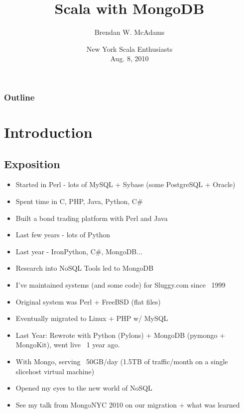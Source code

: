 \documentclass{beamer}
\title[Integrating Scala + MongoDB]{Scala with MongoDB} %
\author[B.W. McAdams]{Brendan W. McAdams}
\institute[Novus Partners]{Novus Partners, Inc.}
\date[NY Scala Enthusiasts - 8/8/10]
     {New York Scala Enthusiasts\\ Aug. 8, 2010}
\newenvironment{itemizeframe}
               {\begin{frame}\startitemizeframe} 
               {\stopitemizeframe\end{frame}}
\newcommand\startitemizeframe{\begin{itemize}} \newcommand\stopitemizeframe{\end{itemize}}
\begin{document}
\begin{frame}
  \titlepage
\end{frame}

\begin{frame}
\frametitle{Outline}
  \tableofcontents
\end{frame}

\section{Introduction}
\subsection{Exposition}

\begin{itemizeframe}
\frametitle{Who Am I?}
    \item Started in Perl - lots of MySQL + Sybase (some PostgreSQL + Oracle)
	\item Spent time in C, PHP, Java, Python, C\#
	\item Built a bond trading platform with Perl and Java
	\item Last few years - lots of Python
	\item Last year - IronPython, C\#, MongoDB... 
	\item Research into NoSQL Tools led to MongoDB
\end{itemizeframe}


\begin{itemizeframe}
\frametitle{Briefly - Sluggy.com Rundown}
    \item I've maintained systems (and some code) for Sluggy.com since ~1999
    \item Original system was Perl + FreeBSD (flat files)
    \item Eventually migrated to Linux + PHP w/ MySQL
    \item Last Year: Rewrote with Python (Pylons) + MongoDB (pymongo + MongoKit), went live ~1 year ago.
    \item With Mongo, serving ~50GB/day (1.5TB of traffic/month on a single slicehost virtual machine)
    \item Opened my eyes to the new world of NoSQL
    \item See my talk from MongoNYC 2010 on our migration + what was learned
\end{itemizeframe}
\end{document}
